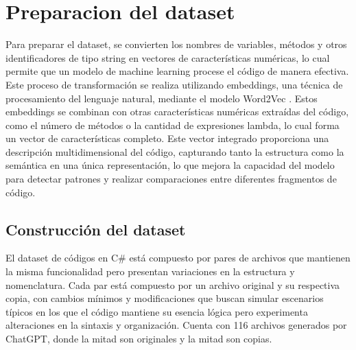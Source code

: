 \chapter{Preparacion del dataset}\label{chapter:proposal}

Para preparar el dataset, se convierten los nombres de variables, métodos y otros identificadores de tipo string en vectores de características numéricas, lo cual permite que un modelo de machine learning procese el código de manera efectiva. Este proceso de transformación se realiza utilizando embeddings, una técnica de procesamiento del lenguaje natural, mediante el modelo Word2Vec \cite{mikolov2013efficient}. Estos embeddings se combinan con otras características numéricas extraídas del código, como el número de métodos o la cantidad de expresiones lambda, lo cual forma un vector de características completo. Este vector integrado proporciona una descripción multidimensional del código, capturando tanto la estructura como la semántica en una única representación, lo que mejora la capacidad del modelo para detectar patrones y realizar comparaciones entre diferentes fragmentos de código.

\section{Construcción del dataset}

El dataset de códigos en C\# está compuesto por pares de archivos que mantienen la misma funcionalidad pero presentan variaciones en la estructura y nomenclatura. Cada par está compuesto por un archivo original y su respectiva copia, con cambios mínimos y modificaciones que buscan simular escenarios típicos en los que el código mantiene su esencia lógica pero experimenta alteraciones en la sintaxis y organización. Cuenta con 116 archivos generados por ChatGPT, donde la mitad son originales y la mitad son copias.

